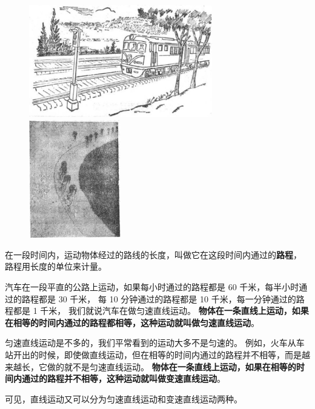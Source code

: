 \begin{figure}[htbp]
    \centering
    \begin{minipage}{8cm}
    \centering
    \includegraphics[width=8cm]{../pic/czwl1-ch3-2}
    \caption{}\label{fig:3-2}
    \end{minipage}
    \qquad
    \begin{minipage}{4cm}
    \centering
    \includegraphics[width=4cm]{../pic/czwl1-ch3-3}
    \caption{}\label{fig:3-3}
    \end{minipage}
\end{figure}


在一段时间内，运动物体经过的路线的长度，叫做它在这段时间内通过的\textbf{路程}，
路程用长度的单位来计量。

汽车在一段平直的公路上运动，如果每小时通过的路程都是 60 千米，每半小时通过的路程都是 30 千米，
每 10 分钟通过的路程都是 10 千米，每一分钟通过的路程都是 1 千米，
我们就说汽车在做匀速直线运动。
\textbf{物体在一条直线上运动，如果在相等的时间内通过的路程都相等，这种运动就叫做匀速直线运动}。

匀速直线运动是不多的，我们平常看到的运动大多不是匀速的。
例如，火车从车站开出的时候，即使做直线运动，但在相等的时间内通过的路程并不相等，而是越来越长，它做的就不是匀速直线运动。
\textbf{物体在一条直线上运动，如果在相等的时间内通过的路程并不相等，这种运动就叫做变速直线运动}。

可见，直线运动又可以分为匀速直线运动和变速直线运动两种。

